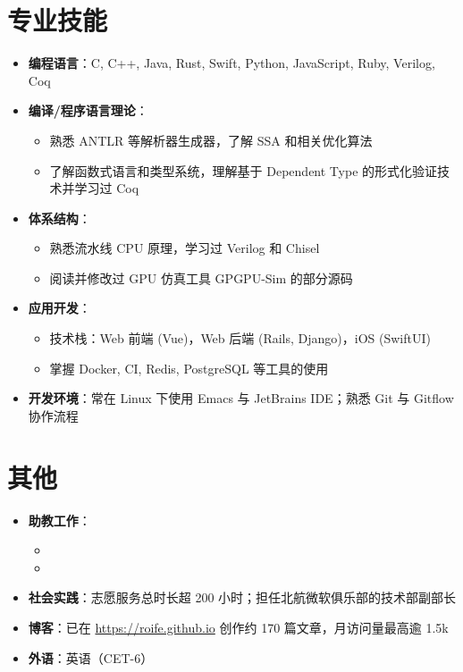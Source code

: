 \documentclass{resume}
\begin{document}
\section{专业技能}
\begin{itemize}
  \item \textbf{编程语言}：C, C++, Java, Rust, Swift, Python, JavaScript, Ruby, Verilog, Coq

  \item \textbf{编译/程序语言理论}：
    \begin{itemize}
      \item 熟悉 ANTLR 等解析器生成器，了解 SSA 和相关优化算法
      \item 了解函数式语言和类型系统，理解基于 Dependent Type 的形式化验证技术并学习过 Coq
    \end{itemize}

  \item \textbf{体系结构}：
    \begin{itemize}
      \item 熟悉流水线 CPU 原理，学习过 Verilog 和 Chisel
      \item 阅读并修改过 GPU 仿真工具 GPGPU-Sim 的部分源码
    \end{itemize}

  \item \textbf{应用开发}：
    \begin{itemize}
      \item 技术栈：Web 前端 (Vue)，Web 后端 (Rails, Django)，iOS (SwiftUI)
      \item 掌握 Docker, CI, Redis, PostgreSQL 等工具的使用
    \end{itemize}

  \item \textbf{开发环境}：常在 Linux 下使用 Emacs 与 JetBrains IDE；熟悉 Git 与 Gitflow 协作流程
\end{itemize}

\section{其他}
\begin{itemize}
  \item \textbf{助教工作}：
        \begin{itemize}
          \item {}
          \item {}
        \end{itemize}
  \item \textbf{社会实践}：志愿服务总时长超 200 小时；担任北航微软俱乐部的技术部副部长
  \item \textbf{博客}：已在 \url{https://roife.github.io} 创作约 170 篇文章，月访问量最高逾 1.5k
  \item \textbf{外语}：英语（CET-6）
\end{itemize}
\end{document}
